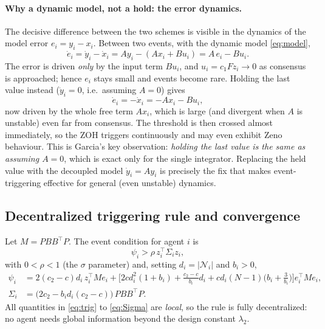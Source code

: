 \documentclass[11pt,a4paper]{article}
\theoremstyle{remark}
\newcommand{\Ni}{\mathcal{N}_i}
\newcommand{\T}{^{\top}}
\begin{document}
\paragraph{Why a dynamic model, not a hold: the error dynamics.} The decisive difference between the
two schemes is visible in the dynamics of the model error $e_i=y_i-x_i$. Between two events, with the
dynamic model \eqref{eq:model},
\begin{equation}
\dot e_i = \dot y_i - \dot x_i = A y_i - (A x_i + B u_i) = A\,e_i - B u_i .
\label{eq:err-model}
\end{equation}
The error is driven \emph{only} by the input term $Bu_i$, and $u_i=c_1Fz_i\to 0$ as consensus is
approached; hence $e_i$ stays small and events become rare. Holding the last value instead
($\dot y_i=0$, i.e.\ assuming $A=0$) gives
\begin{equation}
\dot e_i = -\dot x_i = -A x_i - B u_i ,
\label{eq:err-zoh}
\end{equation}
now driven by the whole free term $A x_i$, which is large (and divergent when $A$ is unstable)
even far from consensus. The threshold is then crossed almost immediately, so the ZOH triggers
continuously and may even exhibit Zeno behaviour. This is Garcia's key observation: \emph{holding the
last value is the same as assuming $A=0$}, which is exact only for the single integrator. Replacing
the held value with the decoupled model $\dot y_i=Ay_i$ is precisely the fix that makes
event-triggering effective for general (even unstable) dynamics.

\subsection{Decentralized triggering rule and convergence}
\label{sec:mb-conv}
Let $M = PBB\T P$. The event condition for agent $i$ is
\begin{equation}
\psi_i > \rho\, z_i\T \Sigma_i z_i,
\label{eq:trig}
\end{equation}
with $0<\rho<1$ (the $\sigma$ parameter) and, setting $d_i=|\Ni|$ and $b_i>0$,
\begin{align}
\psi_i &= 2(c_2-c)d_i\, z_i\T M e_i
+ \Big[2cd_i^2(1+b_i) + \tfrac{c_2-c}{b_i}d_i + cd_i(N-1)\big(b_i+\tfrac{3}{b_i}\big)\Big] e_i\T M e_i,
\label{eq:psi}\\
\Sigma_i &= \big(2c_2 - b_i d_i (c_2-c)\big)\,PBB\T P.
\label{eq:Sigma}
\end{align}
All quantities in \eqref{eq:trig} to \eqref{eq:Sigma} are \emph{local}, so the rule is fully
decentralized: no agent needs global information beyond the design constant $\lambda_2$.
\end{document}
